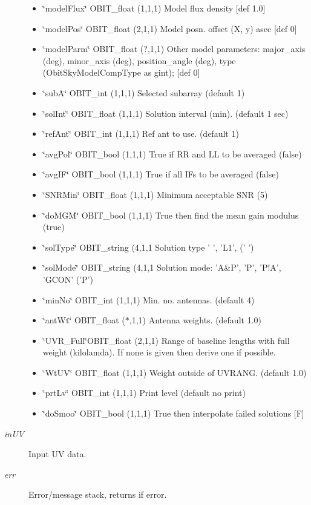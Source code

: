 \begin{Desc}
\begin{description}
\begin{itemize}
\item \char`\"{}model\-Flux\char`\"{} OBIT\_\-float (1,1,1) Model flux density [def 1.0] \item \char`\"{}model\-Pos\char`\"{} OBIT\_\-float (2,1,1) Model posn. offset (X, y) asec [def 0] \item \char`\"{}model\-Parm\char`\"{} OBIT\_\-float (?,1,1) Other model parameters: major\_\-axis (deg), minor\_\-axis (deg), position\_\-angle (deg), type (Obit\-Sky\-Model\-Comp\-Type as gint); [def 0] \item \char`\"{}sub\-A\char`\"{} OBIT\_\-int (1,1,1) Selected subarray (default 1) \item \char`\"{}sol\-Int\char`\"{} OBIT\_\-float (1,1,1) Solution interval (min). (default 1 sec) \item \char`\"{}ref\-Ant\char`\"{} OBIT\_\-int (1,1,1) Ref ant to use. (default 1) \item \char`\"{}avg\-Pol\char`\"{} OBIT\_\-bool (1,1,1) True if RR and LL to be averaged (false) \item \char`\"{}avg\-IF\char`\"{} OBIT\_\-bool (1,1,1) True if all IFs to be averaged (false) \item \char`\"{}SNRMin\char`\"{} OBIT\_\-float (1,1,1) Minimum acceptable SNR (5) \item \char`\"{}do\-MGM\char`\"{} OBIT\_\-bool (1,1,1) True then find the mean gain modulus (true) \item \char`\"{}sol\-Type\char`\"{} OBIT\_\-string (4,1,1 Solution type ' ', 'L1', (' ') \item \char`\"{}sol\-Mode\char`\"{} OBIT\_\-string (4,1,1 Solution mode: 'A\&P', 'P', 'P!A', 'GCON' ('P') \item \char`\"{}min\-No\char`\"{} OBIT\_\-int (1,1,1) Min. no. antennas. (default 4) \item \char`\"{}ant\-Wt\char`\"{} OBIT\_\-float ($\ast$,1,1) Antenna weights. (default 1.0) \item \char`\"{}UVR\_\-Full\char`\"{}OBIT\_\-float (2,1,1) Range of baseline lengths with full weight (kilolamda). If none is given then derive one if possible. \item \char`\"{}Wt\-UV\char`\"{} OBIT\_\-float (1,1,1) Weight outside of UVRANG. (default 1.0) \item \char`\"{}prt\-Lv\char`\"{} OBIT\_\-int (1,1,1) Print level (default no print) \item \char`\"{}do\-Smoo\char`\"{} OBIT\_\-bool (1,1,1) True then interpolate failed solutions [F] \end{itemize}
\item[{\em in\-UV}]Input UV data. \item[{\em err}]Error/message stack, returns if error. \end{description}
\end{Desc}
